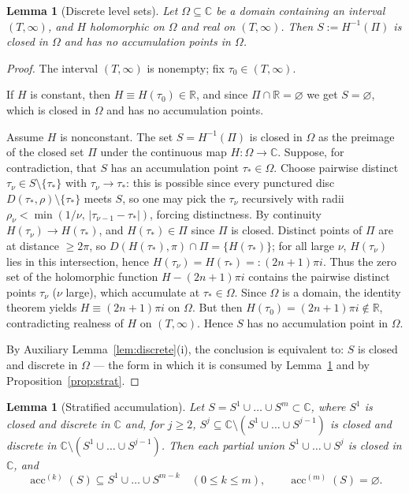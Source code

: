 \documentclass[11pt]{article}
\newtheorem{lemma}[theorem]{Lemma}
\theoremstyle{definition}
\theoremstyle{remark}
\theoremstyle{plain}
\newcommand{\R}{\mathbb{R}}
\newcommand{\C}{\mathbb{C}}
\newcommand{\acc}{\operatorname{acc}}
\begin{document}
\begin{lemma}[Discrete level sets]\label{lem:levelsets}
Let $\Omega\subseteq\C$ be a domain containing an interval $(T,\infty)$, and $H$
holomorphic on $\Omega$ and real on $(T,\infty)$.  Then $S:=H^{-1}(\Pi)$ is closed in
$\Omega$ and has no accumulation points in $\Omega$.
\end{lemma}

\begin{proof}
The interval $(T,\infty)$ is nonempty; fix $\tau_0\in(T,\infty)$.

If $H$ is constant, then $H\equiv H(\tau_0)\in\R$, and since $\Pi\cap\R=\varnothing$ we
get $S=\varnothing$, which is closed in $\Omega$ and has no accumulation points.

Assume $H$ is nonconstant.  The set $S=H^{-1}(\Pi)$ is closed in $\Omega$ as the preimage
of the closed set $\Pi$ under the continuous map $H:\Omega\to\C$.  Suppose, for
contradiction, that $S$ has an accumulation point $\tau_*\in\Omega$.  Choose pairwise
distinct $\tau_\nu\in S\setminus\{\tau_*\}$ with $\tau_\nu\to\tau_*$: this is possible
since every punctured disc $D(\tau_*,\rho)\setminus\{\tau_*\}$ meets $S$, so one may pick
the $\tau_\nu$ recursively with radii $\rho_\nu<\min(1/\nu,\,|\tau_{\nu-1}-\tau_*|)$,
forcing distinctness.  By continuity $H(\tau_\nu)\to H(\tau_*)$, and $H(\tau_*)\in\Pi$
since $\Pi$ is closed.  Distinct points of $\Pi$ are at distance $\ge2\pi$, so
$D(H(\tau_*),\pi)\cap\Pi=\{H(\tau_*)\}$; for all large $\nu$, $H(\tau_\nu)$ lies in this
intersection, hence $H(\tau_\nu)=H(\tau_*)=:(2n+1)\pi i$.  Thus the zero set of the
holomorphic function $H-(2n+1)\pi i$ contains the pairwise distinct points $\tau_\nu$
($\nu$ large), which accumulate at $\tau_*\in\Omega$.  Since $\Omega$ is a domain, the
identity theorem yields $H\equiv(2n+1)\pi i$ on $\Omega$.  But then
$H(\tau_0)=(2n+1)\pi i\notin\R$, contradicting realness of $H$ on $(T,\infty)$.  Hence
$S$ has no accumulation point in $\Omega$.

By Auxiliary Lemma~\ref{lem:discrete}(i), the conclusion is equivalent to: $S$ is closed
and discrete in $\Omega$ --- the form in which it is consumed by
Lemma~\ref{lem:strataacc} and by Proposition~\ref{prop:strat}.
\end{proof}

\begin{lemma}[Stratified accumulation]\label{lem:strataacc}
Let $S=S^1\cup\dots\cup S^m\subset\C$, where $S^1$ is closed and discrete in $\C$ and, for
$j\ge2$, $S^j\subseteq\C\setminus(S^1\cup\dots\cup S^{j-1})$ is closed and discrete in
$\C\setminus(S^1\cup\dots\cup S^{j-1})$.  Then each partial union
$S^1\cup\dots\cup S^j$ is closed in $\C$, and
\[
\acc^{(k)}(S)\subseteq S^1\cup\dots\cup S^{m-k}\quad(0\le k\le m),\qquad
\acc^{(m)}(S)=\varnothing .
\]
\end{lemma}
\end{document}
